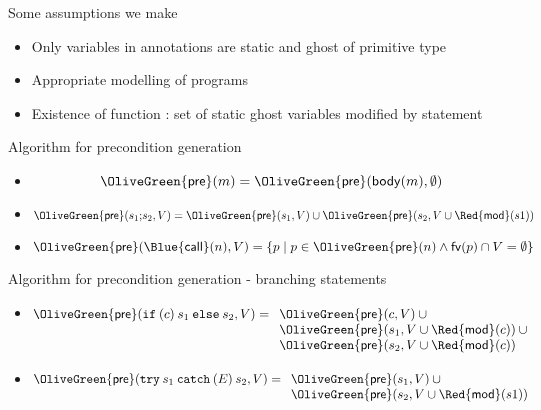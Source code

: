 \documentclass[final,nocolorBG,a4,marieke,nototal,pdf, accumulate,slideColor]{prosper}
\begin{document}
\begin{slide}{Some assumptions we make}
\begin{itemize}
  \item Only variables in annotations are static and ghost of primitive type
  \item Appropriate modelling of programs
  \item Existence of function {\large\textsf{}}: set of static ghost
variables modified by statement 
\end{itemize}
\end{slide}

\begin{slide}{Algorithm for precondition generation}
\begin{itemize}
   \item {}
\[\mathsf{\OliveGreen{pre}}(m)  =  \mathsf{\OliveGreen{pre}}(\mathsf{body}(m), \emptyset)\]
   \item {}
\[\mathsf{\OliveGreen{pre}}(s_1 \mathtt{;} s_2, V)  =  \mathsf{\OliveGreen{pre}}(s_1, V) \cup 
                                          \mathsf{\OliveGreen{pre}}(s_2, V \cup
\mathsf{\Red{mod}}(s1))\]
   \item {}
\[\mathsf{\OliveGreen{pre}}(\mathsf{\Blue{call}}(n),V)  =  
                \{ p \mid p \in \mathsf{\OliveGreen{pre}}(n) \wedge 
                          \mathsf{fv}(p) \cap V = \emptyset\}\]
\end{itemize}
\end{slide}

\begin{slide}{Algorithm for precondition generation - branching statements}
\begin{itemize}
   \item {}
\[
\mathsf{\OliveGreen{pre}}(\mathtt{if\:(} c \mathtt{)\:} s_1 \mathtt{\:else\:} s_2,
V)  = 
\begin{array}[t]{l}
   \mathsf{\OliveGreen{pre}}(c, V) \:\cup \\
   \mathsf{\OliveGreen{pre}}(s_1, V \cup \mathsf{\Red{mod}}(c)) \:\cup\\
   \mathsf{\OliveGreen{pre}}(s_2, V \cup \mathsf{\Red{mod}}(c))
\end{array}\]
\item {}
\[\mathsf{\OliveGreen{pre}}(\mathtt{try\:} s_1 \mathtt{\:catch\:(} E \mathtt{)\:} s_2, V)  =  \begin{array}[t]{l}
   \mathsf{\OliveGreen{pre}}(s_1, V) \:\cup \\
   \mathsf{\OliveGreen{pre}}(s_2, V \cup \mathsf{\Red{mod}}(s1))
  \end{array}\]
\end{itemize}
\end{slide}
\end{document}
